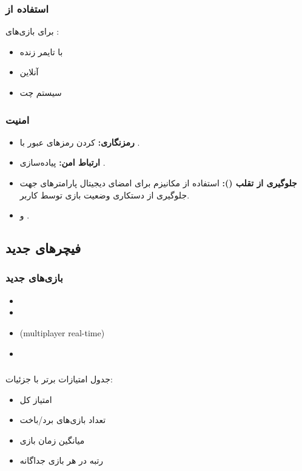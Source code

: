 \documentclass[12pt,a4paper]{article}
\begin{document}
	\subsubsection{استفاده از }
	برای بازی‌های :
	\begin{itemize}
		\item {} با تایمر زنده
		\item {} آنلاین
		\item سیستم چت
	\end{itemize}
	
	\subsubsection{امنیت}
	\begin{itemize}
		\item \textbf{رمزنگاری:}  کردن رمزهای عبور با .
		\item \textbf{ارتباط امن:} پیاده‌سازی .
		\item \textbf{جلوگیری از تقلب ():} استفاده از مکانیزم  برای امضای دیجیتال پارامترهای  جهت جلوگیری از دستکاری وضعیت بازی توسط کاربر.
		\item {} و .
	\end{itemize}
	
	\subsection{فیچرهای جدید}
	
	\subsubsection{بازی‌های جدید}
	\begin{itemize}
		\item {}
		\item {}
		\item {} (multiplayer real-time)
		\item {}
	\end{itemize}
	
	\subsubsection{}
	جدول امتیازات برتر با جزئیات:
	\begin{itemize}
		\item امتیاز کل
		\item تعداد بازی‌های برد/باخت
		\item میانگین زمان بازی
		\item رتبه در هر بازی جداگانه
	\end{itemize}
	
\end{document}
